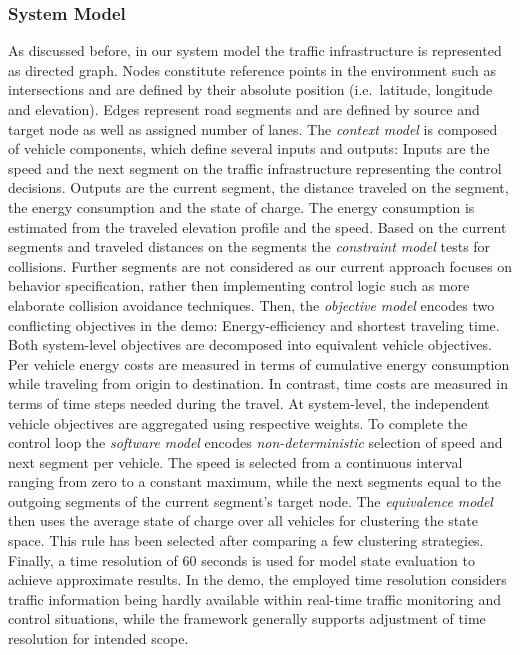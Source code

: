 \documentclass[conference]{../cls/IEEEtran}
\begin{document}
\subsubsection*{System Model}

As discussed before, in our system model the traffic infrastructure is
represented as directed graph. Nodes constitute reference points in the
environment such as intersections and are defined by their absolute position
(i.e.\ latitude, longitude and elevation). Edges represent road segments and are
defined by source and target node as well as assigned number of lanes. The
\textit{context model} is composed of vehicle components, which define several
inputs and outputs: Inputs are the speed and the next segment on the traffic
infrastructure representing the control decisions. Outputs are the current
segment, the distance traveled on the segment, the energy consumption and the
state of charge. The energy consumption is estimated from the traveled elevation
profile and the speed. Based on the current segments and traveled distances on
the segments the \textit{constraint model} tests for collisions. Further
segments are not considered as our current approach focuses on behavior
specification, rather then implementing control logic such as more elaborate collision
avoidance techniques. Then, the \textit{objective model} encodes two conflicting
objectives in the demo: Energy-efficiency and shortest traveling time. Both system-level
objectives are decomposed into equivalent vehicle objectives. Per vehicle energy costs are measured in terms of
cumulative energy consumption while traveling from origin to destination. In
contrast, time costs are measured in terms of time steps needed during the
travel. At system-level, the independent vehicle objectives are aggregated using
respective weights. To complete the control loop the \textit{software model}
encodes \textit{non-deterministic} selection of speed and next segment per
vehicle. The speed is selected from a continuous interval ranging from zero to a
constant maximum, while the next segments equal to the outgoing segments of the
current segment's target node. The \textit{equivalence model} then uses the
average state of charge over all vehicles for clustering the state space. This
rule has been selected after comparing a few clustering strategies. Finally, a
time resolution of 60 seconds is used for model state evaluation to achieve
approximate results. In the demo, the employed time resolution considers
traffic information being hardly available within real-time traffic monitoring
and control situations, while the framework generally supports adjustment of
time resolution for intended scope.
\end{document}
